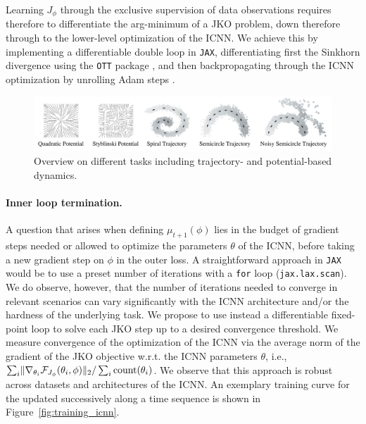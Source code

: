Learning  $J_\phi$ through the exclusive supervision of data observations requires therefore to differentiate the arg-minimum of a \acrshort{JKO} problem, down therefore through to the lower-level optimization of the \acrshort{ICNN}. We achieve this by implementing a differentiable double loop in \texttt{JAX}, differentiating first the Sinkhorn divergence using the \texttt{OTT} package \citep{cuturi2022optimal}, and then backpropagating through the \acrshort{ICNN} optimization by unrolling Adam steps \citep{kingma2014adam, metz2016unrolled, lorraine2020optimizing}.

\begin{figure}[t]
\centering
\includegraphics[width=1.0\textwidth]{figures/fig_task_overview_noise.pdf}
\caption{Overview on different tasks including trajectory- and potential-based dynamics.}
\label{fig:task_overview}
\end{figure}

\paragraph{Inner loop termination.} A question that arises when defining $\mu_{t+1}(\phi)$ lies in the budget of gradient steps needed or allowed to optimize the parameters $\theta$ of the \acrshort{ICNN}, before taking a new gradient step on $\phi$ in the outer loss. A straightforward approach in \texttt{JAX} \citep{jax2018github} would be to use a preset number of iterations with a \texttt{for} loop (\texttt{jax.lax.scan}). 
We do observe, however, that the number of iterations needed to converge in relevant scenarios can vary significantly with the \acrshort{ICNN} architecture and/or the hardness of the underlying task.
We propose to use instead a differentiable fixed-point loop to solve each \acrshort{JKO} step up to a desired convergence threshold.
We measure convergence of the optimization of the \acrshort{ICNN} via the average norm of the gradient of the \acrshort{JKO} objective w.r.t. the \acrshort{ICNN} parameters $\theta$, i.e., $\sum_i \lVert\nabla_{\theta_i}\mathcal{F}_{J_\phi}(\theta_i, \phi)\rVert_2/\sum_i \text{count}(\theta_i)$.
We observe that this approach is robust across datasets and architectures of the \acrshort{ICNN}. An exemplary training curve for the  updated successively along a time sequence is shown in Figure~\ref{fig:training_icnn}.

